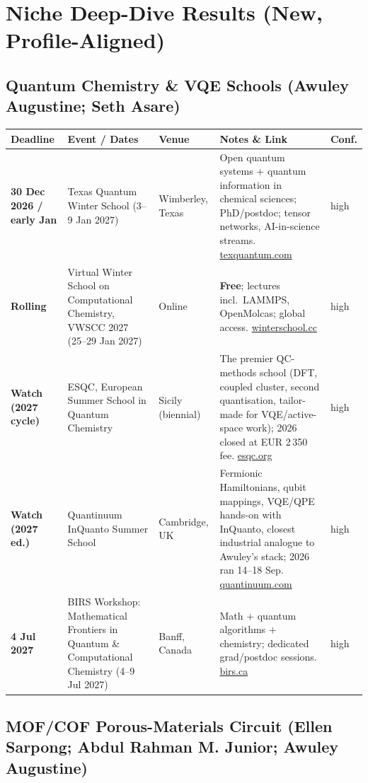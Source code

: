 \documentclass[11pt,a4paper]{article}
\begin{document}
\section{Niche Deep-Dive Results (New, Profile-Aligned)}

\subsection{Quantum Chemistry \& VQE Schools (Awuley Augustine; Seth Asare)}

\begin{longtable}{@{}p{3.2cm}p{3.0cm}p{2.5cm}p{5.2cm}p{1.6cm}@{}}
\toprule
\textbf{Deadline} & \textbf{Event / Dates} & \textbf{Venue} & \textbf{Notes \& Link} & \textbf{Conf.} \\
\midrule
\endhead
\textbf{30 Dec 2026 / early Jan} & Texas Quantum Winter School (3--9 Jan 2027) & Wimberley, Texas & Open quantum systems + quantum information in chemical sciences; PhD/postdoc; tensor networks, AI-in-science streams. \href{https://www.texquantum.com/index.html}{texquantum.com} & high \\
\midrule
\textbf{Rolling} & Virtual Winter School on Computational Chemistry, VWSCC 2027 (25--29 Jan 2027) & Online & \textbf{Free}; lectures incl.\ LAMMPS, OpenMolcas; global access. \href{https://winterschool.cc/}{winterschool.cc} & high \\
\midrule
\textbf{Watch (2027 cycle)} & ESQC, European Summer School in Quantum Chemistry & Sicily (biennial) & The premier QC-methods school (DFT, coupled cluster, second quantisation, tailor-made for VQE/active-space work); 2026 closed at EUR 2\,350 fee. \href{https://www.esqc.org/}{esqc.org} & high \\
\midrule
\textbf{Watch (2027 ed.)} & Quantinuum InQuanto Summer School & Cambridge, UK & Fermionic Hamiltonians, qubit mappings, VQE/QPE hands-on with InQuanto, closest industrial analogue to Awuley's stack; 2026 ran 14--18 Sep. \href{https://www.quantinuum.com/inquanto-summer-school}{quantinuum.com} & high \\
\midrule
\textbf{4 Jul 2027} & BIRS Workshop: Mathematical Frontiers in Quantum \& Computational Chemistry (4--9 Jul 2027) & Banff, Canada & Math $+$ quantum algorithms $+$ chemistry; dedicated grad/postdoc sessions. \href{https://www.birs.ca/events/2027/5-day-workshops/27w5742}{birs.ca} & high \\
\bottomrule
\end{longtable}

\subsection{MOF/COF Porous-Materials Circuit (Ellen Sarpong; Abdul Rahman M. Junior; Awuley Augustine)}
\end{document}
